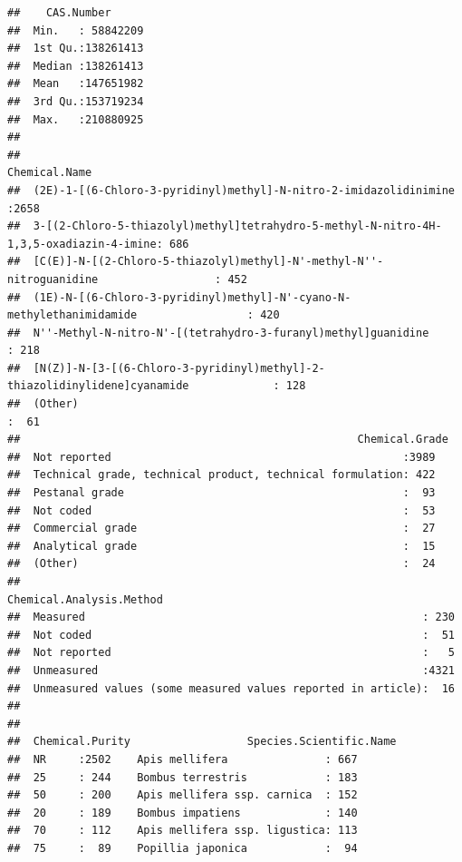 \documentclass[]{article}
\begin{document}
\begin{verbatim}
##    CAS.Number       
##  Min.   : 58842209  
##  1st Qu.:138261413  
##  Median :138261413  
##  Mean   :147651982  
##  3rd Qu.:153719234  
##  Max.   :210880925  
##                     
##                                                                                 Chemical.Name 
##  (2E)-1-[(6-Chloro-3-pyridinyl)methyl]-N-nitro-2-imidazolidinimine                     :2658  
##  3-[(2-Chloro-5-thiazolyl)methyl]tetrahydro-5-methyl-N-nitro-4H-1,3,5-oxadiazin-4-imine: 686  
##  [C(E)]-N-[(2-Chloro-5-thiazolyl)methyl]-N'-methyl-N''-nitroguanidine                  : 452  
##  (1E)-N-[(6-Chloro-3-pyridinyl)methyl]-N'-cyano-N-methylethanimidamide                 : 420  
##  N''-Methyl-N-nitro-N'-[(tetrahydro-3-furanyl)methyl]guanidine                         : 218  
##  [N(Z)]-N-[3-[(6-Chloro-3-pyridinyl)methyl]-2-thiazolidinylidene]cyanamide             : 128  
##  (Other)                                                                               :  61  
##                                                    Chemical.Grade
##  Not reported                                             :3989  
##  Technical grade, technical product, technical formulation: 422  
##  Pestanal grade                                           :  93  
##  Not coded                                                :  53  
##  Commercial grade                                         :  27  
##  Analytical grade                                         :  15  
##  (Other)                                                  :  24  
##                                                  Chemical.Analysis.Method
##  Measured                                                    : 230       
##  Not coded                                                   :  51       
##  Not reported                                                :   5       
##  Unmeasured                                                  :4321       
##  Unmeasured values (some measured values reported in article):  16       
##                                                                          
##                                                                          
##  Chemical.Purity                  Species.Scientific.Name
##  NR     :2502    Apis mellifera               : 667      
##  25     : 244    Bombus terrestris            : 183      
##  50     : 200    Apis mellifera ssp. carnica  : 152      
##  20     : 189    Bombus impatiens             : 140      
##  70     : 112    Apis mellifera ssp. ligustica: 113      
##  75     :  89    Popillia japonica            :  94      

\end{verbatim}
\end{document}
